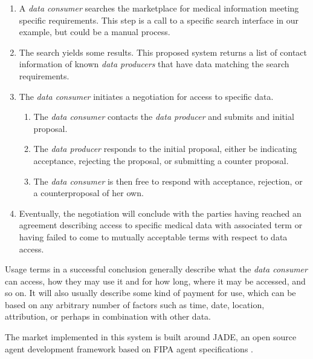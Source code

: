 \documentclass[10pt, conference, compsocconf]{IEEEtran}
\begin{document}
\begin{enumerate}

\item A \textit{data consumer} searches the marketplace for medical information meeting specific requirements.  This step is a call to a specific search interface in our example, but could be a manual process.

\item The search yields some results.  This proposed system returns a list of contact information of known \textit{data producers} that have data matching the search requirements.

\item The \textit{data consumer} initiates a negotiation for access to specific data.

\begin{enumerate}

\item The \textit{data consumer} contacts the \textit{data producer} and submits and initial proposal.

\item The \textit{data producer} responds to the initial proposal, either be indicating acceptance, rejecting the proposal, or submitting a counter proposal.

\item The \textit{data consumer} is then free to respond with acceptance, rejection, or a counterproposal of her own.

\end{enumerate}

\item Eventually, the negotiation will conclude with the parties having reached an agreement describing access to specific medical data with associated term or having failed to come to mutually acceptable terms with respect to data access.  

\end{enumerate}

Usage terms in a successful conclusion generally describe what the \textit{data consumer} can access, how they may use it and for how long, where it may be accessed, and so on.  It will also usually describe some kind of payment for use, which can be based on any arbitrary number of factors such as time, date, location, attribution, or perhaps in combination with other data.

The market implemented in this system is built around JADE, an open source agent development framework based on FIPA agent specifications \cite{Emr:Web:Jade,Emr:Web:Fipa}.
\end{document}
